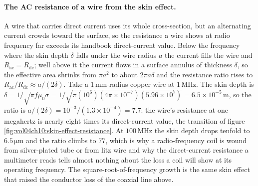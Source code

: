 \paragraph{The AC resistance of a wire from the skin effect.}
A wire that carries direct current uses its whole cross-section, but an
alternating current crowds toward the surface, so the resistance a wire
shows at radio frequency far exceeds its handbook direct-current value.
Below the frequency where the skin depth $\delta$ falls under the wire
radius $a$ the current fills the wire and $R_{\text{ac}} = R_{\text{dc}}$;
well above it the current flows in a surface annulus of thickness $\delta$,
so the effective area shrinks from $\pi a^2$ to about $2\pi a\delta$ and
the resistance ratio rises to $R_{\text{ac}}/R_{\text{dc}}\approx a/
(2\delta)$. Take a $1\,\si{\milli\meter}$-radius copper wire at $1\,\si{
\mega\hertz}$. The skin depth is $\delta = 1/\sqrt{\pi f\mu_0\sigma} =
1/\sqrt{\pi(10^{6})(4\pi\times 10^{-7})(5.96\times 10^{7})} = 6.5\times
10^{-5}\,\si{\meter}$, so the ratio is $a/(2\delta) = 10^{-3}/(1.3\times
10^{-4}) = 7.7$: the wire's resistance at one megahertz is nearly eight
times its direct-current value, the transition of figure
\ref{fig:vol04ch10:skin-effect-resistance}. At $100\,\si{\mega\hertz}$ the
skin depth drops tenfold to $6.5\,\si{\micro\meter}$ and the ratio climbs
to $77$, which is why a radio-frequency coil is wound from silver-plated
tube or from litz wire and why the direct-current resistance a multimeter
reads tells almost nothing about the loss a coil will show at its operating
frequency. The square-root-of-frequency growth is the same skin effect
that raised the conductor loss of the coaxial line above.



